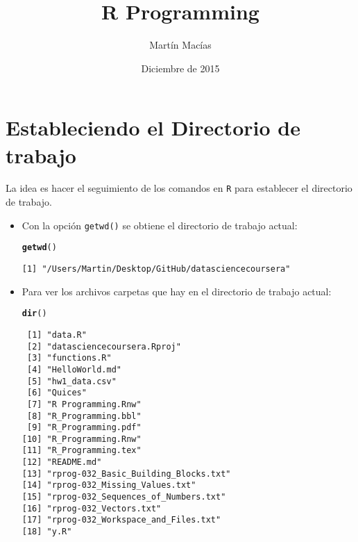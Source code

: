 \documentclass{article}\usepackage[]{graphicx}\usepackage[]{color}
\title{R Programming}
\author{Martín Macías}
\date{Diciembre de 2015}
\makeatletter
\newcommand{\hlstd}[1]{\textcolor[rgb]{0.345,0.345,0.345}{#1}}%
\newcommand{\hlkwd}[1]{\textcolor[rgb]{0.737,0.353,0.396}{\textbf{#1}}}%
\newenvironment{kframe}{%
 \def\at@end@of@kframe{}%
 \ifinner\ifhmode%
  \def\at@end@of@kframe{\end{minipage}}%
  \begin{minipage}{\columnwidth}%
 \fi\fi%
 \def\FrameCommand##1{\hskip\@totalleftmargin \hskip-\fboxsep
 \colorbox{shadecolor}{##1}\hskip-\fboxsep
     \hskip-\linewidth \hskip-\@totalleftmargin \hskip\columnwidth}%
 \MakeFramed {\advance\hsize-\width
   \@totalleftmargin\z@ \linewidth\hsize
   \@setminipage}}%
 {\par\unskip\endMakeFramed%
 \at@end@of@kframe}
\newenvironment{knitrout}{}{} %
\makeatother
\begin{document}
\maketitle

\section{Estableciendo el Directorio de trabajo}
La idea es hacer el seguimiento de los comandos en \texttt{R} para establecer el directorio de trabajo.\\
\begin{itemize}
  \item Con la opción \texttt{getwd()} se obtiene el directorio de trabajo actual:
\begin{knitrout}
\color{fgcolor}\begin{kframe}
\begin{alltt}
  \hlkwd{getwd}\hlstd{()}
\end{alltt}
\begin{verbatim}
[1] "/Users/Martin/Desktop/GitHub/datasciencecoursera"
\end{verbatim}
\end{kframe}
\end{knitrout}

  \item Para ver los archivos  carpetas que hay en el directorio de trabajo actual:
\begin{knitrout}
\color{fgcolor}\begin{kframe}
\begin{alltt}
  \hlkwd{dir}\hlstd{()}
\end{alltt}
\begin{verbatim}
 [1] "data.R"                             
 [2] "datasciencecoursera.Rproj"          
 [3] "functions.R"                        
 [4] "HelloWorld.md"                      
 [5] "hw1_data.csv"                       
 [6] "Quices"                             
 [7] "R Programming.Rnw"                  
 [8] "R_Programming.bbl"                  
 [9] "R_Programming.pdf"                  
[10] "R_Programming.Rnw"                  
[11] "R_Programming.tex"                  
[12] "README.md"                          
[13] "rprog-032_Basic_Building_Blocks.txt"
[14] "rprog-032_Missing_Values.txt"       
[15] "rprog-032_Sequences_of_Numbers.txt" 
[16] "rprog-032_Vectors.txt"              
[17] "rprog-032_Workspace_and_Files.txt"  
[18] "y.R"                                
\end{verbatim}
\end{kframe}
\end{knitrout}


\end{itemize}
\end{document}

